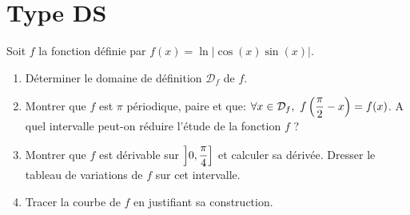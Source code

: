 \documentclass[a4paper, 11pt]{article}
\begin{document}
\section*{Type DS}
\begin{exercice}  \;
\noindent Soit $f$ la fonction d\'efinie par $f(x)=\ln{\left|  \cos{(x)}\sin{(x)} \right|}$.
\begin{enumerate}
\item D\'eterminer le domaine de d\'efinition $\mathcal{D}_f$ de $f$.
\item Montrer que $f$ est $\pi$ p\'eriodique, paire et que: $\forall x\in\mathcal{D}_f,\ f\left( \displaystyle\frac{\pi}{2}-x\right)=f(x)$. A quel intervalle peut-on r\'eduire l'\'etude de la fonction $f$ ?
\item Montrer  que $f$ est d\'erivable sur $\left \rbrack 0,\displaystyle\frac{\pi}{4}\right\rbrack$ et calculer sa d\'eriv\'ee. Dresser le tableau de variations de $f$ sur cet intervalle.
\item Tracer la courbe de $f$ en justifiant sa construction.
\end{enumerate}
\end{exercice}
\end{document}
